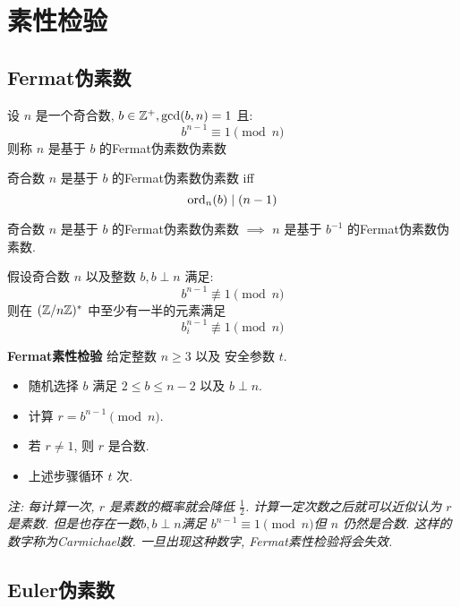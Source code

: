 \section{素性检验}

\subsection{Fermat伪素数}

\begin{definition}[Fermat伪素数]
    设 \(n\) 是一个奇合数, \(b \in \mathbb{Z}^+, \gcd(b,n)=1\) 且:
    \[b^{n-1} \equiv 1 \pmod{n}\]
    则称 \(n\) 是基于 \(b\) 的Fermat伪素数伪素数
\end{definition}

\begin{theorem}[Fermat伪素数伪素数的性质]
    奇合数 \(n\) 是基于 \(b\) 的Fermat伪素数伪素数 iff
    \[\mathrm{ord}_{n}(b) \mid (n-1)\]
\end{theorem}

\begin{theorem}[Fermat伪素数与模逆]
    奇合数 \(n\) 是基于 \(b\) 的Fermat伪素数伪素数 \(\implies\)
    \(n\) 是基于 \(b^{-1}\) 的Fermat伪素数伪素数.
\end{theorem}

\begin{theorem}[Fermat伪素数与简化剩余系]
    假设奇合数 \(n\) 以及整数 \(b, b\perp n\) 满足:
    \[b^{n-1} \not \equiv 1 \pmod{n}\]
    则在 \((\mathbb{Z}/n\mathbb{Z})^*\) 中至少有一半的元素满足
    \[b_i^{n-1} \not \equiv 1 \pmod{n}\]
\end{theorem}

\textbf{Fermat素性检验} \hspace{1em} 给定整数 \(n \ge 3\) 以及
安全参数 \(t\).
\begin{itemize}
    \item 随机选择 \(b\) 满足 \(2 \le b \le n-2\) 以及 \(b \perp n\).
    \item 计算 \(r = b^{n-1} \pmod{n}\).
    \item 若 \(r \ne 1\), 则 \(r\) 是合数.
    \item 上述步骤循环 \(t\) 次.
\end{itemize}

\textit{注: 每计算一次, \(r\) 是素数的概率就会降低 \(\frac{1}{2}\).
计算一定次数之后就可以近似认为 \(r\) 是素数.
但是也存在一数\(b,b\perp n\)满足 \(b^{n-1} \equiv 1 \pmod{n}\)但 \(n\) 仍然是合数.
这样的数字称为Carmichael数. 一旦出现这种数字, Fermat素性检验将会失效.
}

\subsection{Euler伪素数}

